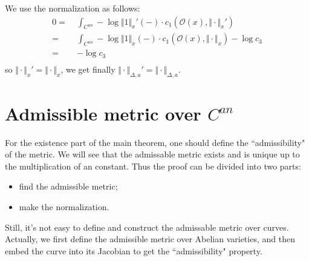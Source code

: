 \documentclass[reqno,11pt]{amsart}
\numberwithin{equation}{section}
\theoremstyle{plain}
\theoremstyle{plain}
\numberwithin{equation}{section}
\theoremstyle{remark}
\newcommand{\norm}[1]{\Vert{#1}\Vert}
\begin{document}
We use the normalization as follows:
\begin{equation*}
\begin{aligned}
0  =\;& \int_{C^{an}}-\log \norm{1}_x'(-) \cdot c_1(\mathcal{O}(x),\norm{\cdot}_x')\\ 
  =\;& \int_{C^{an}}-\log \norm{1}_x(-) \cdot c_1(\mathcal{O}(x),\norm{\cdot}_x) -\log c_3 \\ 
  =\;&  -\log c_3 \\ 
\end{aligned}
\end{equation*}
so $\norm{\cdot}_x'=\norm{\cdot}_x$, we get finally $\norm{\cdot}_{\Delta,a}'=\norm{\cdot}_{\Delta,a}$.

\section{Admissible metric over $C^{an}$}\label{sec:existence}

For the existence part of the main theorem, one should define the ``admissibility" of the metric. We will see that the admissable metric exists and is unique up to the multiplication of an constant. Thus the proof can be divided into two parts:
\begin{itemize}
\item find the admissible metric;
\item make the normalization.
\end{itemize}
Still, it's not easy to define and construct the admissable metric over curves. Actually, we first define the admissible metric over Abelian varieties, and then embed the curve into its Jacobian to get the ``admissibility" property.
\end{document}

